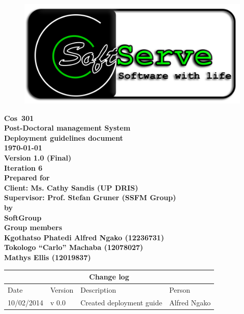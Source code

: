 \documentclass[12pt]{article}
\newcommand{\Title}{Deployment guidelines document} %
\newcommand{\Class}{Cos\ 301} %
\newcommand{\ssr}{Soft\color{green}{Serve }\color{black}}
\newcommand{\version}{1.0 (Final)}
\newcommand{\iteration}{6}
\newcommand{\client}{Ms. Cathy Sandis (UP DRIS)}
\newcommand{\supervisor}{Prof. Stefan Gruner (SSFM Group)}
\newcommand{\project}{Post-Doctoral management System}
\begin{document}
\vspace{4em}

\begin{center}%

\begin{figure}[ht!]
\centering
\includegraphics{../Images_Docs/logo.png}
\end{figure}
\LARGE \bf \Class \\[0.25em]
\LARGE \bf \project \\[1em]
\LARGE \bf \Title \\[0.25em]
\large \bf \today\\
\bf Version \version\\
\bf Iteration \iteration\\[0.5em]
\Large \bf Prepared for \\Client: \client\\Supervisor: \supervisor
\Large \\\bf by \\
\Large {\bf \ssr Group }\\[0.5em]
\LARGE {\bf Group members}\\[0.25em]
\large
Kgothatso Phatedi Alfred Ngako (12236731) \\[0.5em]
Tokologo “Carlo” Machaba (12078027) \\[0.5em]
Mathys Ellis (12019837) \\[8em]

\end{center}%


\begin{center}
\begin{tabular}{|l|p{1.4cm}|p{8cm}|p{2.8cm}|}
\hline
\multicolumn{4}{|c|}{\bf Change log} \\
\hline
 Date & Version & Description &  Person \\
\hline
10/02/2014 & v 0.0 & Created deployment guide & Alfred Ngako \\
\hline

\end{tabular}
\end{center}
\newpage
\tableofcontents
\end{document}
